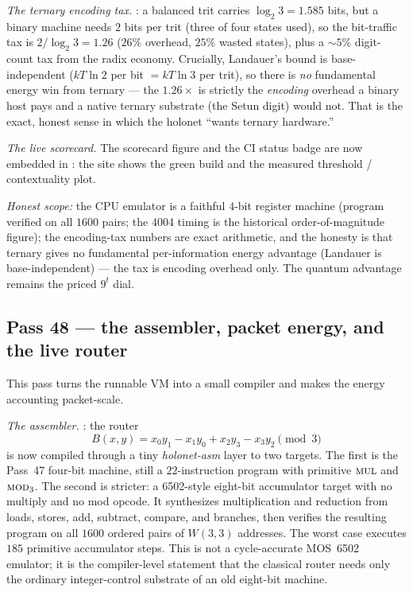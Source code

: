 \documentclass[11pt]{article}
\begin{document}
\emph{The ternary encoding tax.} : a balanced trit carries
$\log_2 3=1.585$ bits, but a binary machine needs $2$ bits per trit (three of four states used), so the
bit-traffic tax is $2/\log_2 3=1.26$ ($26\%$ overhead, $25\%$ wasted states), plus a $\sim5\%$
digit-count tax from the radix economy. Crucially, Landauer's bound is base-independent ($kT\ln2$ per bit
$=kT\ln3$ per trit), so there is \emph{no} fundamental energy win from ternary --- the $1.26\times$ is
strictly the \emph{encoding} overhead a binary host pays and a native ternary substrate (the Setun
digit) would not. That is the exact, honest sense in which the holonet ``wants ternary hardware.''

\emph{The live scorecard.} The scorecard figure and the CI status badge are now embedded in
: the site shows the green build and the measured threshold / contextuality plot.

\emph{Honest scope:} the CPU emulator is a faithful $4$-bit register machine (program verified on all
$1600$ pairs; the 4004 timing is the historical order-of-magnitude figure); the encoding-tax numbers are
exact arithmetic, and the honesty is that ternary gives no fundamental per-information energy advantage
(Landauer is base-independent) --- the tax is encoding overhead only. The quantum advantage remains the
priced $9^t$ dial.

\subsection{Pass 48 --- the assembler, packet energy, and the live router}
\label{sec:capstone-fortyeight}

This pass turns the runnable VM into a small compiler and makes the energy accounting packet-scale.

\emph{The assembler.} : the router
\[
  B(x,y)=x_0y_1-x_1y_0+x_2y_3-x_3y_2\pmod 3
\]
is now compiled through a tiny \emph{holonet-asm} layer to two targets.  The
first is the Pass~47 four-bit machine, still a $22$-instruction program with
primitive \(\textsc{mul}\) and \(\textsc{mod}_3\).  The second is stricter:
a 6502-style eight-bit accumulator target with no multiply and no mod opcode.
It synthesizes multiplication and reduction from loads, stores, add, subtract,
compare, and branches, then verifies the resulting program on all \(1600\)
ordered pairs of \(W(3,3)\) addresses.  The worst case executes \(185\)
primitive accumulator steps.  This is not a cycle-accurate MOS~6502 emulator;
it is the compiler-level statement that the classical router needs only the
ordinary integer-control substrate of an old eight-bit machine.
\end{document}

